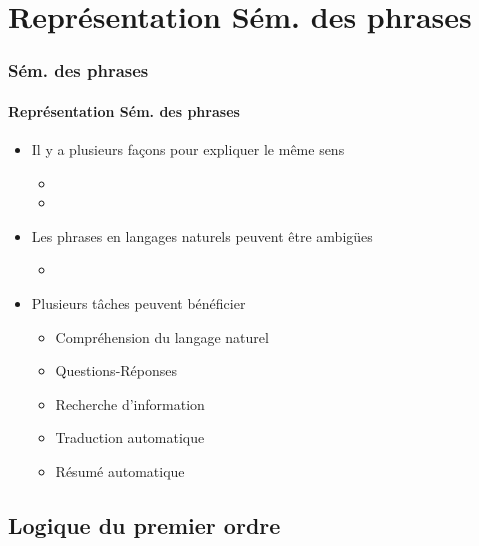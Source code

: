 \documentclass[xcolor=table]{beamer}
\begin{document}
\section{Représentation Sém. des phrases}

\begin{frame}
	\frametitle{Sém. des phrases}
	\framesubtitle{Représentation Sém. des phrases}
	
	\begin{itemize}
		\item Il y a plusieurs façons pour expliquer le même sens
		\begin{itemize}
			\item {}
			\item {}
		\end{itemize}
	
		\item Les phrases en langages naturels peuvent être ambigües
		\begin{itemize}
			\item {}
		\end{itemize}
	
		\item Plusieurs tâches peuvent bénéficier 
		\begin{itemize}
			\item Compréhension du langage naturel
			\item Questions-Réponses
			\item Recherche d'information
			\item Traduction automatique
			\item Résumé automatique
		\end{itemize}
	\end{itemize}
	
\end{frame}

\subsection{Logique du premier ordre}
\end{document}
